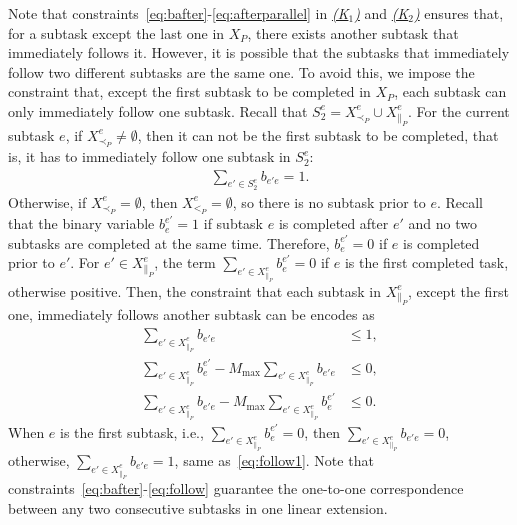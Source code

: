 \documentclass[Afour,sageh,times]{sagej}
\begin{document}
{{{{{Note that constraints~\eqref{eq:bafter}-\eqref{eq:afterparallel} in \hyperref[activation:a]{\it (K$_1$)} and \hyperref[activation:b]{\it (K$_2$)} ensures that, for a subtask except the last one in $X_P$, there exists another subtask that immediately follows it. However, it is possible that the subtasks that immediately follow two different subtasks are the same one. To avoid this, we impose the constraint that, except the first subtask   to be completed in $X_P$, each subtask  can only immediately follow one subtask. Recall that $S_2^e = X^e_{\prec_{P}} \cup X^e_{\|_{P}}$.  For the current subtask $e$, if  $X^e_{\prec_{P}} \neq \emptyset$, then it can not be the first subtask to be completed, that is, it has to immediately follow one subtask in $S_2^e$:
\begingroup\makeatletter\def\f@size{10}\check@mathfonts
\def\maketag@@@#1{\hbox{\m@th\normalsize\normalfont#1}}%
  \begin{align}\label{eq:follow1}
 \sum_{e' \in S_2^e} b_{e'e} = 1.
\end{align}
  \endgroup
Otherwise, if $X^e_{\prec_{P}} = \emptyset$, then  $X^e_{<_{P}} = \emptyset$,  so there is no subtask prior to $e$. Recall that the binary variable $b_e^{e'}=1$ if subtask $e$ is completed after $e'$ and no two subtasks are completed at the same time. Therefore, $b_e^{e'}=0$ if $e$ is completed prior to $e'$. For $e' \in  X_{\|_P}^e$, the term $\sum_{e' \in X_{\|_P}^e } {b}_{e}^{e'}=0$ if $e$ is the first completed task, otherwise  positive. Then, the constraint that each subtask in $X_{\|_P}^e$, except the first one,  immediately follows another subtask can be encodes as
\begingroup\makeatletter\def\f@size{10}\check@mathfonts
\def\maketag@@@#1{\hbox{\m@th\normalsize\normalfont#1}}%
\begin{subequations}\label{eq:follow}
  \begin{align}
  \sum_{e' \in X_{\|_P}^e} b_{e'e} & \le 1,\label{eq:follow_a}\\
 \sum_{e' \in X^e_{\|_{P}}  } b_{e}^{e'} - M_{\text{max}}  \sum_{e' \in X_{\|_P}^e} b_{e'e} &  \leq 0, \label{eq:follow_b} \\
  \sum_{e' \in X_{\|_P}^e} b_{e'e} - M_{\text{max}} \sum_{e' \in X^e_{\|_{P}}  } b_{e}^{e'} & \leq0 . \label{eq:follow_c}
\end{align}
\end{subequations}
\endgroup
When $e$ is the first subtask, i.e., $\sum_{e' \in X^e_{\|_{P}}  } b_{e}^{e'}=0$, then $\sum_{e' \in X_{\|_P}^e} b_{e'e} = 0$, otherwise, $\sum_{e' \in X_{\|_P}^e} b_{e'e} = 1$, same as~\eqref{eq:follow1}. Note that constraints~\eqref{eq:bafter}-\eqref{eq:follow} guarantee the one-to-one correspondence between any two consecutive subtasks in one linear extension.


}}}}}
\end{document}
